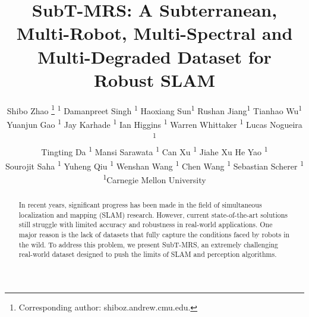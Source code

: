 \documentclass[10pt,twocolumn,letterpaper]{article}
\title{SubT-MRS: A Subterranean, Multi-Robot, Multi-Spectral and\\Multi-Degraded Dataset for Robust SLAM}
\author{\large Shibo Zhao \thanks{Corresponding author: shiboz.andrew.cmu.edu.}  \textsuperscript{1} \quad Damanpreet Singh \textsuperscript{1} \quad Haoxiang Sun\textsuperscript{1}  \quad Rushan Jiang\textsuperscript{1} \quad Tianhao Wu\textsuperscript{1} \\  \quad Yuanjun Gao  \textsuperscript{1} \quad Jay Karhade  \textsuperscript{1} \quad Ian Higgins  \textsuperscript{1} \quad Warren Whittaker
\textsuperscript{1}  \quad Lucas Nogueira   
\textsuperscript{1} \\
\quad Tingting Da \textsuperscript{1}  \quad Mansi Sarawata  
\textsuperscript{1} \quad Can Xu  \textsuperscript{1} \quad Jiahe Xu \quad He Yao  \textsuperscript{1}  \\  
\quad Sourojit Saha  \textsuperscript{1} 
\quad Yuheng Qiu  \textsuperscript{1} \quad Wenshan Wang  \textsuperscript{1}   
\quad Chen Wang  \textsuperscript{1} \quad Sebastian Scherer 
\textsuperscript{1} \vspace{1.5 mm}\\
	{\normalsize \textsuperscript{1}Carnegie Mellon University \quad }  
    }
\begin{document}


\begin{abstract}



 In recent years, significant progress has been made in the field of simultaneous localization and mapping (SLAM) research. However, current state-of-the-art solutions still struggle with limited accuracy and robustness in real-world applications. 
One major reason is the lack of datasets that fully capture the conditions faced by robots in the wild. To address this problem, we present SubT-MRS, an extremely challenging real-world dataset designed to push the limits of SLAM and perception algorithms. 


\end{abstract}
\end{document}
